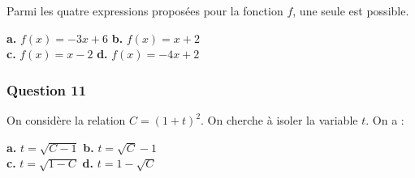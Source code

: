 \documentclass[10pt]{article}
\begin{document}
Parmi les quatre expressions proposées pour la fonction $f$, une seule est possible.

\textbf{a.} $f(x) = -3x + 6$ \hfill \textbf{b.} $f(x) = x + 2$ \\
\textbf{c.} $f(x) = x - 2$ \hfill \textbf{d.} $f(x) = -4x + 2$

\subsubsection*{Question 11}
On considère la relation $C = (1 + t)^2$. On cherche à isoler la variable $t$. On a :

\textbf{a.} $t = \sqrt{C - 1}$ \hfill \textbf{b.} $t = \sqrt{C} - 1$ \\
\textbf{c.} $t = \sqrt{1 - C}$ \hfill \textbf{d.} $t = 1 - \sqrt{C}$

\bigskip
\end{document}
